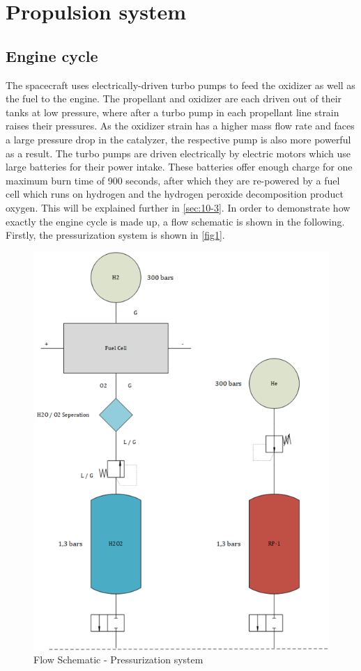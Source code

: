 \chapter{Propulsion system}
\section{Engine cycle}
\qquad The spacecraft uses electrically-driven turbo pumps to feed the oxidizer as well as the fuel to the engine. The propellant and oxidizer are each driven out of their tanks at low pressure, where after a turbo pump in each propellant line strain raises their pressures. As the oxidizer strain has a higher mass flow rate and faces a large pressure drop in the catalyzer, the respective pump is also more powerful as a result. The turbo pumps are driven electrically by electric motors which use large batteries for their power intake. These batteries offer enough charge for one maximum burn time of 900 seconds, after which they are re-powered by a fuel cell which runs on hydrogen and the hydrogen peroxide decomposition product oxygen. This will be explained further in \autoref{sec:10-3}. In order to demonstrate how exactly the engine cycle is made up, a flow schematic is shown in the following. Firstly, the pressurization system is shown in \autoref{fig1}.
\begin{figure}[H]
	\centering\includegraphics[width=0.5\linewidth]{pressurizationsystem}
	\caption{Flow Schematic - Pressurization system}\label{fig1}
\end{figure}

